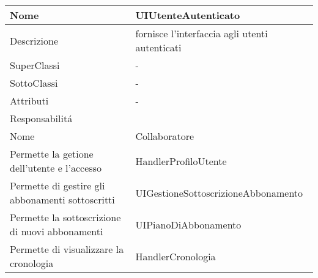 \begin{center} %
    \begin{longtable}{ |p{3cm}|p{3cm}|p{3cm}|p{3cm}| }
        \hline
        Nome & \multicolumn{3}{|p{9cm}|}{UIUtenteAutenticato} \\\hline
        Descrizione & \multicolumn{3}{|p{9cm}|}{fornisce l'interfaccia agli utenti autenticati} \\\hline
        SuperClassi & \multicolumn{3}{|p{9cm}|}{-} \\\hline
        SottoClassi & \multicolumn{3}{|p{9cm}|}{-} \\\hline
        Attributi & \multicolumn{3}{|p{9cm}|}{-} \\\hline
        \multicolumn{4}{|p{12cm}|}{Responsabilit\'a} \\\hline %
        \multicolumn{2}{|p{6cm}|}{Nome} & \multicolumn{2}{|p{6cm}|}{Collaboratore} \\\hline %
        \multicolumn{2}{|p{6cm}|}{Permette la getione dell'utente e l'accesso} & \multicolumn{2}{|p{6cm}|}{HandlerProfiloUtente} \\\hline
        \multicolumn{2}{|p{6cm}|}{Permette di gestire gli abbonamenti sottoscritti} & \multicolumn{2}{|p{6cm}|}{UIGestioneSottoscrizioneAbbonamento} \\\hline
        \multicolumn{2}{|p{6cm}|}{Permette la sottoscrizione di nuovi abbonamenti} & \multicolumn{2}{|p{6cm}|}{UIPianoDiAbbonamento} \\\hline
        \multicolumn{2}{|p{6cm}|}{Permette di visualizzare la cronologia} & \multicolumn{2}{|p{6cm}|}{HandlerCronologia} \\\hline
    \end{longtable}
\end{center}

